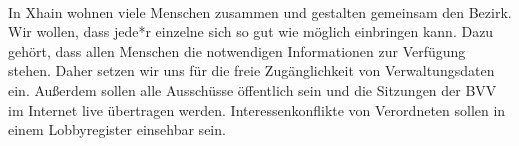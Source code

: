 \documentclass[a4paper,10pt]{article}
\newcommand{\mysection}[1]{{\vspace{1cm}\noindent\color{gray}{\ttfamily\LARGE\raggedright #1}\\\medskip}}
\begin{document}







\mysection{Präambel}%



In Xhain wohnen viele Menschen zusammen und gestalten gemeinsam den
Bezirk. Wir wollen, dass jede*r einzelne sich so gut wie möglich
einbringen kann. Dazu gehört, dass allen Menschen die notwendigen
Informationen zur Verfügung stehen. Daher setzen wir uns für die freie
Zugänglichkeit von Verwaltungsdaten ein. Außerdem sollen alle Ausschüsse
öffentlich sein und die Sitzungen der BVV im Internet live übertragen
werden. Interessenkonflikte von Verordneten sollen in einem
Lobbyregister einsehbar sein.
\end{document}
